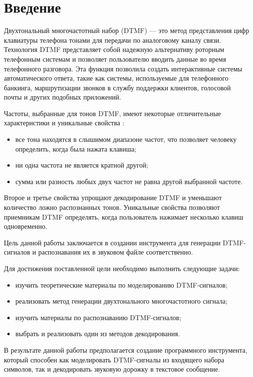 \chapter*{Введение} %

Двухтональный многочастотный набор (DTMF) — это метод представления цифр клавиатуры телефона тонами для передачи по аналоговому каналу связи. Технология DTMF представляет собой надежную альтернативу роторным телефонным системам и позволяет пользователю вводить данные во время телефонного разговора. Эта функция позволила создать интерактивные системы автоматического ответа, такие как системы, используемые для телефонного банкинга, маршрутизации звонков в службу поддержки клиентов, голосовой почты и других подобных приложений.

Частоты, выбранные для тонов DTMF, имеют некоторые отличительные характеристики и уникальные свойства \cite{dtmf}:

\begin{itemize}
	\item все тона находятся в слышимом диапазоне частот, что позволяет человеку определить, когда была нажата клавиша;
	\item ни одна частота не является кратной другой;
	\item сумма или разность любых двух частот не равна другой выбранной частоте.
\end{itemize} 

Второе и третье свойства упрощают декодирование DTMF и уменьшают количество ложно распознанных тонов. Уникальные свойства позволяют приемникам DTMF определять, когда пользователь нажимает несколько клавиш одновременно.

Цель данной работы заключается в создании инструмента для генерации DTMF-сигналов и распознавания их в звуковом файле соответственно.

Для достижения поставленной цели необходимо выполнить следующие задачи:

\begin{itemize}
	\item изучить теоретические материалы по моделированию DTMF-сигналов;
	\item реализовать метод генерации двухтонального многочастотного сигнала;
	\item изучить материалы по распознаванию DTMF-сигналов;
	\item выбрать и реализовать один из методов декодирования.
\end{itemize} 

В результате данной работы предполагается создание программного инструмента, который способен как моделировать DTMF-сигналы из входящего набора символов, так и декодировать звуковую дорожку в текстовое сообщение. 

\newpage %
